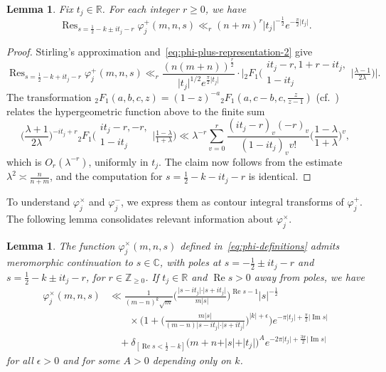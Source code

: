 \documentclass[11pt,reqno]{amsart}
\theoremstyle{plain}
\newtheorem{lemma}[theorem]{Lemma}
\theoremstyle{definition}
\numberwithin{equation}{section}
\renewcommand{\Im}{\operatorname{Im}}
\renewcommand{\Re}{\operatorname{Re}}
\DeclareMathOperator*{\Res}{Res}
\begin{document}
\begin{lemma} \label{lem:phi-plus-residue-bound}
Fix $t_j \in \mathbb{R}$. For each integer $r \geq 0$, we have
\[
	\Res_{s =\frac{1}{2}-k \pm it_j - r} \varphi_j^+(m,n,s)
	\ll_r (n+m)^r \vert t_j \vert^{-\frac{1}{2}} e^{-\frac{\pi}{2} \vert t_j \vert}.
\]
\end{lemma}

\begin{proof}
Stirling's approximation and~\eqref{eq:phi-plus-representation-2} give
\[
	\Res_{s = \frac{1}{2}-k + it_j - r} \varphi_j^+(m,n,s)
	\ll_r \frac{(n(m+n))^{\frac{r}{2}}}{\vert t_j \vert^{1/2} e^{\frac{\pi}{2} \vert t_j \vert}}
	\cdot \Big\vert {}_2F_1\Big(\begin{matrix} it_j-r, 1+r-it_j,\\ 1-it_j \end{matrix} \Big\vert \tfrac{\lambda-1}{2\lambda}\Big)\Big\vert.
\]
The transformation ${}_2F_1(a,b,c,z) = (1-z)^{-a} {}_2F_1(a,c-b,c, \frac{z}{z-1})$ (cf.~\cite[9.131(1)]{GradshteynRyzhik07}) relates the hypergeometric function above to the finite sum
\[
	\Big(\frac{\lambda+1}{2\lambda}\Big)^{-it_j + r}
	{}_2F_1\Big(\begin{matrix} it_j-r, -r,\\ 1-it_j \end{matrix} \Big\vert \tfrac{1-\lambda}{1+\lambda}\Big)
	\ll \lambda^{-r} \sum_{v=0}^r \frac{(it_j-r)_v (-r)_v}{(1-it_j)_v v!} \Big(\frac{1-\lambda}{1+\lambda}\Big)^v,
\]
which is $O_r(\lambda^{-r})$, uniformly in $t_j$. The claim now follows from the estimate $\lambda^2 \asymp \frac{n}{n+m}$, and the computation for $s=\frac{1}{2} -k-it_j -r$ is identical.
\end{proof}

To understand $\varphi_j^\times$ and $\varphi_j^-$, we express them as contour integral transforms of $\varphi_j^+$. The following lemma consolidates relevant information about $\varphi_j^\times$.

\begin{lemma} \label{lem:phi-cross-behavior}
The function $\varphi_j^\times(m,n,s)$ defined in~\eqref{eq:phi-definitions} admits meromorphic continuation to $s \in \mathbb{C}$, with poles at $s = -\frac{1}{2} \pm it_j -r$ and $s = \frac{1}{2} - k \pm it_j - r$, for $r \in \mathbb{Z}_{\geq 0}$. If $t_j \in \mathbb{R}$ and $\Re s > 0$ away from poles, we have
\begin{align} \label{eq:phi-cross-upper-bound}
	\varphi_j^\times(m,n,s)
	&\ll  \frac{1}{(m-n)^k\sqrt{m}}
	\Big( \frac{\vert s - it_j \vert \cdot \vert s + it_j\vert}{m \vert s \vert}\Big)^{\Re s -1}
	\vert s \vert^{-\frac{1}{2}} \\
	& \qquad
	\times \! \Big( 
		1 + \Big( 
					\frac{m\vert s \vert}{(m-n)\vert s - it_j \vert \cdot \vert s + it_j\vert}
					\Big)^{\vert k \vert +\epsilon} \Big)
	e^{-\pi \vert t_j \vert + \frac{\pi}{2} \vert \Im s \vert}  \\
	& \quad 
	+ \delta_{[\Re s < \frac{1}{2} - k]} \big(m+n+ \vert s \vert + \vert t_j \vert\big)^A
	e^{-2\pi \vert t_j \vert + \frac{3\pi}{2} \vert \Im s \vert}
\end{align}
for all $\epsilon > 0$ and for some $A>0$ depending only on $k$.
\end{lemma}
\end{document}
